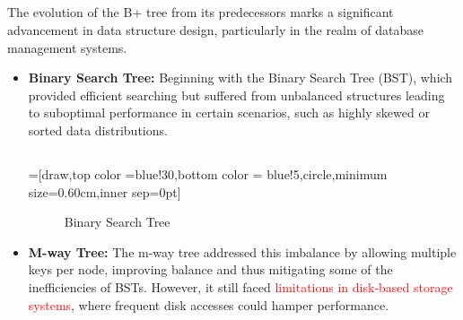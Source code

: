 \documentclass{article}
\begin{document}
    \subsection*{}     The evolution of the B+ tree from its predecessors marks a significant advancement in data structure design, particularly in the realm of database management systems.
    \begin{itemize}
        \item \textbf{Binary Search Tree:} Beginning with the Binary Search Tree (BST), which provided efficient searching but suffered from unbalanced structures leading to suboptimal performance in certain scenarios, such as highly skewed or sorted data distributions.
        \subsection*{}
        \usetikzlibrary{arrows,positioning, calc}
        =[draw,top color =blue!30,bottom color = blue!5,circle,minimum size=0.60cm,inner sep=0pt]
        \begin{figure}[ht]
            \centering
            \caption{Binary Search Tree}
        \end{figure}
                
        \item \textbf{M-way Tree:} The m-way tree addressed this imbalance by allowing multiple keys per node, improving balance and thus mitigating some of the inefficiencies of BSTs. However, it still faced \textcolor{red}{limitations in disk-based storage systems}, where frequent disk accesses could hamper performance.

\end{itemize}
\end{document}
